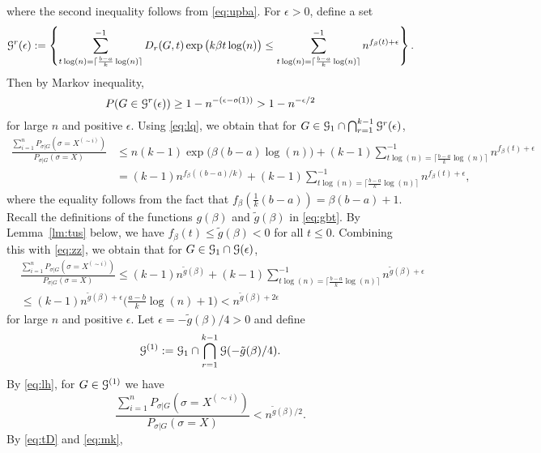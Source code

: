 \documentclass{article}
\begin{document}
where the second inequality follows from \eqref{eq:upba}.
For $\epsilon>0$, define a set
$$
\mathcal{G}^r(\epsilon):=\left\{
\sum_{t\log(n)=\lceil\frac{b-a}{k}\log(n) \rceil}^{-1} D_r(G,t)
\exp\big(k\beta t \log(n) \big)
\le \sum_{t\log(n)=\lceil\frac{b-a}{k}\log(n) \rceil}^{-1}
 n^{f_{\beta}(t) + \epsilon}
\right\} .
$$
Then by Markov inequality,
\begin{equation} \label{eq:mk}
P(G\in \mathcal{G}^r(\epsilon))\ge 1-n^{-(\epsilon-o(1))} >
1-n^{-\epsilon/2}
\end{equation}
for large $n$ and positive $\epsilon$.
Using \eqref{eq:lq}, we obtain that for $G\in\mathcal{G}_1\cap \bigcap_{r=1}^{k-1}\mathcal{G}^r(\epsilon)$,
\begin{equation}  \label{eq:zz}
\begin{aligned}
\frac{\sum_{i=1}^n P_{\sigma|G}(\sigma=X^{(\sim i)} )}
{P_{\sigma|G}(\sigma=X)} 
& \le n(k-1)
\exp\big(\beta(b-a)\log(n) \big)  + (k-1)\sum_{t\log(n)=\lceil\frac{b-a}{k}\log(n) \rceil}^{-1}  n^{f_{\beta}(t) + \epsilon} \\
& = (k-1)n^{f_{\beta}((b-a)/k)} + (k-1)\sum_{t\log(n)=\lceil\frac{b-a}{k}\log(n) \rceil}^{-1}  n^{f_{\beta}(t) + \epsilon} ,
\end{aligned}
\end{equation}
where the equality follows from the fact that $f_{\beta}(\frac{1}{k}(b-a))=\beta(b-a)+1$.
Recall the definitions of the functions $g(\beta)$ and $\tilde{g}(\beta)$ in \eqref{eq:gbt}.
By Lemma~\ref{lm:tus} below, we have
$f_{\beta}(t)\le \tilde{g}(\beta)<0$ for all $t\le 0$.
Combining this with \eqref{eq:zz}, we obtain that for
$G\in\mathcal{G}_1\cap\mathcal{G}(\epsilon)$,
\begin{equation} \label{eq:lh}
\begin{aligned}
& \frac{\sum_{i=1}^n P_{\sigma|G}(\sigma=X^{(\sim i)} )}
{P_{\sigma|G}(\sigma=X)} 
\le (k-1)n^{\tilde{g}(\beta)}
+ (k-1)\sum_{t\log(n)=\lceil\frac{b-a}{k}\log(n) \rceil}^{-1}  n^{\tilde{g}(\beta) + \epsilon}  \\
& \le (k-1)n^{\tilde{g}(\beta) + \epsilon}
\big(\frac{a-b}{k}\log(n)+1 \big)
< n^{\tilde{g}(\beta) + 2\epsilon} 
\end{aligned}
\end{equation}
for large $n$ and positive $\epsilon$.
Let $\epsilon=-\tilde{g}(\beta)/4>0$ and define
$$
\mathcal{G}^{(1)}:=\mathcal{G}_1\cap \bigcap_{r=1}^{k-1}\mathcal{G}(-\tilde{g}(\beta)/4) .
$$
By \eqref{eq:lh}, for $G\in\mathcal{G}^{(1)}$ we have
$$
\frac{\sum_{i=1}^n P_{\sigma|G}(\sigma=X^{(\sim i)} )}
{P_{\sigma|G}(\sigma=X)} <
n^{\tilde{g}(\beta) /2} .
$$
By \eqref{eq:tD} and \eqref{eq:mk}, 
\end{document}
